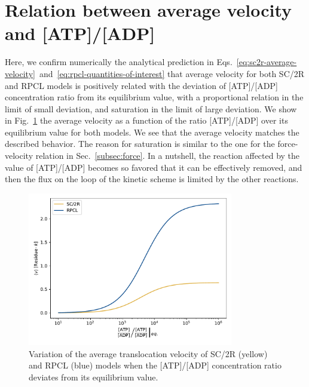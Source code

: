 \documentclass{article}
\theoremstyle{remark}
\begin{document}
\section{Relation between average velocity and [ATP]/[ADP]}
\label{app:average-velocity-vs-atp-adp-ratio}
Here, we confirm numerically the analytical prediction in Eqs.~\eqref{eq:sc2r-average-velocity}~and~\eqref{eq:rpcl-quantities-of-interest} that average velocity for both SC/2R and RPCL models is positively related with the deviation of [ATP]/[ADP] concentration ratio from its equilibrium value, with a proportional relation in the limit of small deviation, and saturation in the limit of large deviation. We show in Fig.~\ref{fig:velocity-vs-atp-adp-ratio} the average velocity as a function of the ratio [ATP]/[ADP] over its equilibrium value for both models. We see that the average velocity matches the described behavior. The reason for saturation is similar to the one for the force-velocity relation in Sec.~\ref{subsec:force}. In a nutshell, the reaction affected by the value of [ATP]/[ADP] becomes so favored that it can be effectively removed, and then the flux on the loop of the kinetic scheme is limited by the other reactions.

\begin{figure}[h]
    \centering
    \includegraphics[width=0.8\textwidth]{images/velocity_vs_atp_adp_ratio.pdf}
    \caption{Variation of the average translocation velocity of SC/2R (yellow) and RPCL (blue) models when the [ATP]/[ADP] concentration ratio deviates from its equilibrium value.}
    \label{fig:velocity-vs-atp-adp-ratio}
\end{figure}
\end{document}
